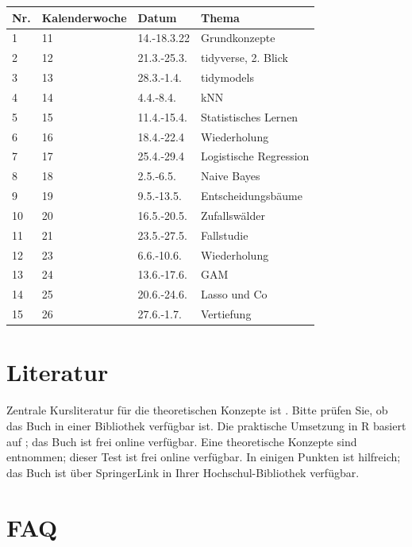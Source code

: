 \documentclass[
]{book}
\begin{document}
\begin{longtable}[]{@{}llll@{}}
\toprule
Nr. & Kalenderwoche & Datum & Thema \\
\midrule
\endhead
1 & 11 & 14.-18.3.22 & Grundkonzepte \\
2 & 12 & 21.3.-25.3. & tidyverse, 2. Blick \\
3 & 13 & 28.3.-1.4. & tidymodels \\
4 & 14 & 4.4.-8.4. & kNN \\
5 & 15 & 11.4.-15.4. & Statistisches Lernen \\
6 & 16 & 18.4.-22.4 & Wiederholung \\
7 & 17 & 25.4.-29.4 & Logistische Regression \\
8 & 18 & 2.5.-6.5. & Naive Bayes \\
9 & 19 & 9.5.-13.5. & Entscheidungsbäume \\
10 & 20 & 16.5.-20.5. & Zufallswälder \\
11 & 21 & 23.5.-27.5. & Fallstudie \\
12 & 23 & 6.6.-10.6. & Wiederholung \\
13 & 24 & 13.6.-17.6. & GAM \\
14 & 25 & 20.6.-24.6. & Lasso und Co \\
15 & 26 & 27.6.-1.7. & Vertiefung \\
\bottomrule
\end{longtable}

\hypertarget{literatur}{%
\section{Literatur}\label{literatur}}

Zentrale Kursliteratur für die theoretischen Konzepte ist \citet{rhys}.
Bitte prüfen Sie, ob das Buch in einer Bibliothek verfügbar ist.
Die praktische Umsetzung in R basiert auf \citet{silge_tidy_2022}; das Buch ist frei online verfügbar. Eine theoretische Konzepte sind \citet{islr} entnommen; dieser Test ist frei online verfügbar. In einigen Punkten ist \citet{modar} hilfreich; das Buch ist über SpringerLink in Ihrer Hochschul-Bibliothek verfügbar.

\hypertarget{faq}{%
\section{FAQ}\label{faq}}
\end{document}
